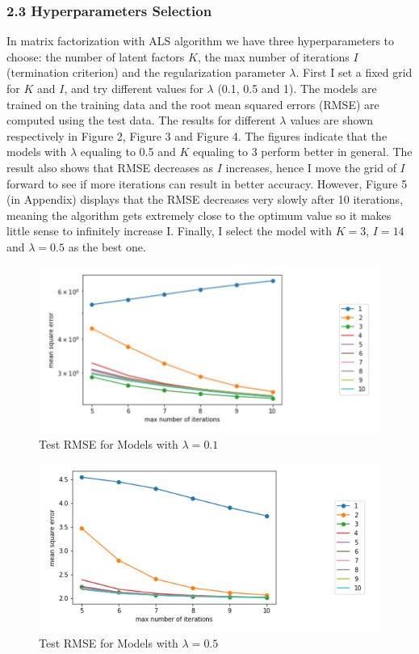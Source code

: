 \documentclass{article}
\begin{document}
\subsubsection*{2.3  Hyperparameters Selection}

\noindent In matrix factorization with ALS algorithm we have three hyperparameters to choose: 
the number of latent factors $K$, the max number of iterations $I$ (termination criterion) and the 
regularization parameter $\lambda$. First I set a fixed grid for $K$ and $I$, and try different values for 
$\lambda$ (0.1, 0.5 and 1). The models are trained on the training data and the root mean squared errors 
(RMSE) are computed using the test data. The results for different $\lambda$ values are shown respectively 
in Figure 2, Figure 3 and Figure 4. The figures indicate that the models with $\lambda$ equaling to 0.5 and $K$ 
equaling to 3 perform better in general. The result also shows that RMSE decreases as $I$ increases, 
hence I move the grid of $I$ forward to see if more iterations can result in better accuracy. However, 
Figure 5 (in Appendix) displays that the RMSE decreases very slowly after 10 iterations, meaning the 
algorithm gets extremely close to the optimum value so it makes little sense to infinitely increase I. 
Finally, I select the model with $K=3$, $I=14$ and $\lambda =0.5$ as the best one.


\begin{figure}[H]
	\centering
	\includegraphics[scale=0.5]{figs/figure2.png}
	\caption{Test RMSE for Models with $\lambda =0.1$} 
	\label{figure2}
\end{figure}


\begin{figure}[H]
	\centering
	\includegraphics[scale=0.5]{figs/figure3.png}
	\caption{Test RMSE for Models with $\lambda =0.5$} 
	\label{figure3}
\end{figure}
\end{document}

